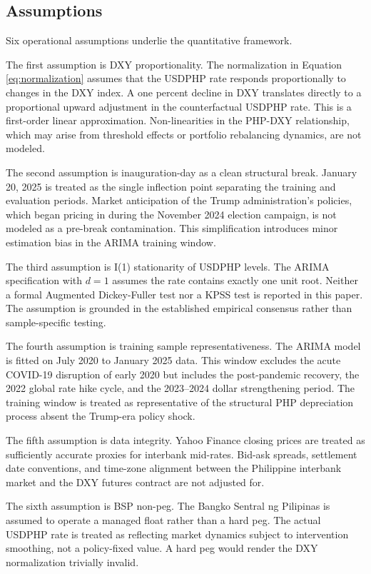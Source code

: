 \documentclass[12pt]{article}
\begin{document}
\subsection{Assumptions}

Six operational assumptions underlie the quantitative framework.

The first assumption is DXY proportionality. The normalization in Equation
\ref{eq:normalization} assumes that the USDPHP rate responds proportionally to
changes in the DXY index. A one percent decline in DXY translates directly to a
proportional upward adjustment in the counterfactual USDPHP rate. This is a
first-order linear approximation. Non-linearities in the PHP-DXY relationship, which
may arise from threshold effects or portfolio rebalancing dynamics, are not modeled.

The second assumption is inauguration-day as a clean structural break. January 20,
2025 is treated as the single inflection point separating the training and evaluation
periods. Market anticipation of the Trump administration's policies, which began
pricing in during the November 2024 election campaign, is not modeled as a pre-break
contamination. This simplification introduces minor estimation bias in the ARIMA
training window.

The third assumption is I(1) stationarity of USDPHP levels. The ARIMA specification
with $d = 1$ assumes the rate contains exactly one unit root. Neither a formal
Augmented Dickey-Fuller test nor a KPSS test is reported in this paper. The
assumption is grounded in the established empirical consensus \citep{meese1983} rather
than sample-specific testing.

The fourth assumption is training sample representativeness. The ARIMA model is
fitted on July 2020 to January 2025 data. This window excludes the acute COVID-19
disruption of early 2020 but includes the post-pandemic recovery, the 2022 global
rate hike cycle, and the 2023--2024 dollar strengthening period. The training window
is treated as representative of the structural PHP depreciation process absent the
Trump-era policy shock.

The fifth assumption is data integrity. Yahoo Finance closing prices are treated as
sufficiently accurate proxies for interbank mid-rates. Bid-ask spreads, settlement
date conventions, and time-zone alignment between the Philippine interbank market and
the DXY futures contract are not adjusted for.

The sixth assumption is BSP non-peg. The Bangko Sentral ng Pilipinas is assumed to
operate a managed float rather than a hard peg. The actual USDPHP rate is treated as
reflecting market dynamics subject to intervention smoothing, not a policy-fixed
value. A hard peg would render the DXY normalization trivially invalid.
\end{document}
